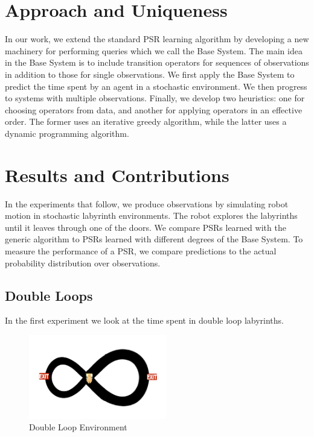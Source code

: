 \documentclass{acm_proc_article-sp}
\begin{document}
\section{Approach and Uniqueness} 

In our work, we extend the standard PSR learning algorithm by developing a new machinery for performing queries which we call the Base System. The main idea in the Base System is to include transition operators for sequences of observations in addition to those for single observations. We first apply the Base System to predict the time spent by an agent in a stochastic environment. We then progress to systems with multiple observations. Finally, we develop two heuristics: one for choosing operators from data, and another for applying operators in an effective order. The former uses an iterative greedy algorithm, while the latter uses a dynamic programming algorithm.

\section{Results and Contributions}

In the experiments that follow, we produce observations by simulating robot motion in stochastic labyrinth environments. The robot explores the labyrinths until it leaves through one of the doors. We compare PSRs learned with the generic algorithm to PSRs learned with different degrees of the Base System. To measure the performance of a PSR, we compare predictions to the actual probability distribution over observations.

\subsection{Double Loops}

In the first experiment we look at the time spent in double loop labyrinths. 


\begin{figure}[ht!]
\centering
\includegraphics[width=60mm]{lucasplots/monImages/doubleLoopImage.png}
\caption{Double Loop Environment\label{overflow}}
\end{figure}
\end{document}
